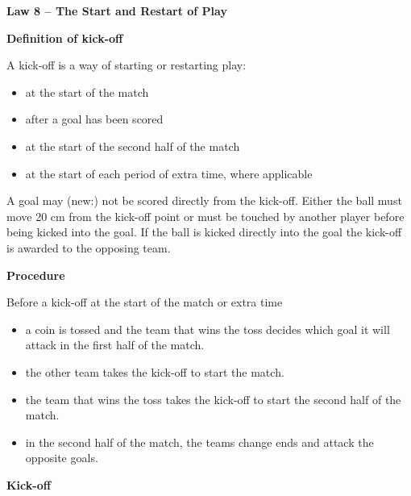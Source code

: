 \clearpage
\sffamily
{\bfseries\color[rgb]{0.4,0.4,0.4}
Law 8 -- The Start and Restart of Play}
{}

\bigskip

{\bfseries Definition of kick-off}

\headlinebox

A kick-off is a way of starting or restarting play:

\begin{itemize}
\item at the start of the match 
\item after a goal has been scored 
\item at the start of the second half of the match 
\item at the start of each period of extra time, where applicable
\end{itemize}

A goal may (new:) not be scored directly from the kick-off. Either the ball must move 20 cm from the kick-off point or must be touched by another player before being kicked into the goal. If the ball is kicked directly into the goal the kick-off is awarded to the opposing team. 

\bigskip

{\bfseries Procedure }

\headlinebox

Before a kick-off at the start of the match or extra time 

\begin{itemize}
\item a coin is tossed and the team that wins the toss decides which goal it will attack in the first half of the match.
\item the other team takes the kick-off to start the match. 
\item the team that wins the toss takes the kick-off to start the second half of the match.
\item in the second half of the match, the teams change ends and attack the opposite goals. 
\end{itemize}

\bigskip

{\bfseries Kick-off}

